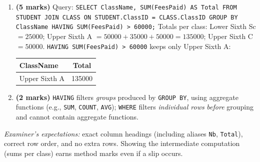 \documentclass[11pt]{article}
\begin{document}
\begin{corrige}
\begin{enumerate}
\begin{center}
\begin{tabular}{|l|c|}
\hline
\end{tabular}
\end{center}
(Upper Sixth A: Bih Anne, Tabi John, Ngo Carine.)
\item \textbf{(5 marks)} Query: \texttt{SELECT ClassName, SUM(FeesPaid) AS Total FROM STUDENT JOIN CLASS ON STUDENT.ClassID = CLASS.ClassID GROUP BY ClassName HAVING SUM(FeesPaid) > 60000;}
Totals per class: Lower Sixth Sc $= 25000$; Upper Sixth A $= 50000+35000+50000 = 135000$; Upper Sixth C $= 50000$. \texttt{HAVING SUM(FeesPaid) > 60000} keeps only Upper Sixth A:
\begin{center}
\begin{tabular}{|l|c|}
\hline
\rowcolor{popblueL} \textbf{ClassName} & \textbf{Total} \\
\hline
Upper Sixth A & 135000 \\
\hline
\end{tabular}
\end{center}
\item \textbf{(2 marks)} \texttt{HAVING} filters \emph{groups} produced by \texttt{GROUP BY}, using aggregate functions (e.g., \texttt{SUM}, \texttt{COUNT}, \texttt{AVG}); \texttt{WHERE} filters \emph{individual rows} \emph{before} grouping and cannot contain aggregate functions.
\end{enumerate}
\emph{Examiner's expectations:} exact column headings (including aliases \texttt{Nb}, \texttt{Total}), correct row order, and no extra rows. Showing the intermediate computation (sums per class) earns method marks even if a slip occurs.
\end{corrige}
\end{document}
